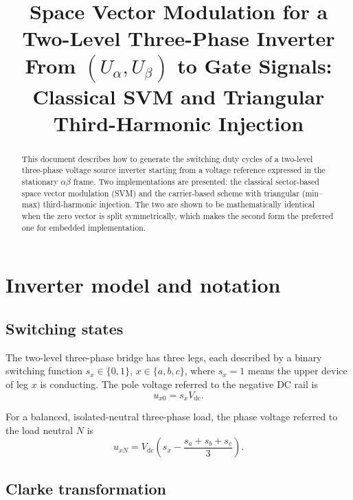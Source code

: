 \documentclass[11pt,a4paper]{article}
\title{Space Vector Modulation for a Two-Level Three-Phase Inverter\\[2mm]
\large From $(U_\alpha, U_\beta)$ to Gate Signals:\\ Classical SVM and Triangular Third-Harmonic Injection}
\author{}
\date{}
\newcommand{\vdc}{V_{\mathrm{dc}}}
\begin{document}
\maketitle

\begin{abstract}
\noindent
This document describes how to generate the switching duty cycles of a two-level
three-phase voltage source inverter starting from a voltage reference expressed in
the stationary $\alpha\beta$ frame. Two implementations are presented: the classical
sector-based space vector modulation (SVM) and the carrier-based scheme with
triangular (min--max) third-harmonic injection. The two are shown to be
mathematically identical when the zero vector is split symmetrically, which makes
the second form the preferred one for embedded implementation.
\end{abstract}

\tableofcontents

\section{Inverter model and notation}

\subsection{Switching states}

The two-level three-phase bridge has three legs, each described by a binary
switching function $s_x \in \{0,1\}$, $x \in \{a,b,c\}$, where $s_x = 1$ means the
upper device of leg $x$ is conducting. The pole voltage referred to the negative DC
rail is
\begin{equation}
u_{x0} = s_x \vdc .
\end{equation}

For a balanced, isolated-neutral three-phase load, the phase voltage referred to the
load neutral $N$ is
\begin{equation}
u_{xN} = \vdc \left( s_x - \frac{s_a + s_b + s_c}{3} \right).
\label{eq:uxN}
\end{equation}

\subsection{Clarke transformation}
\end{document}
